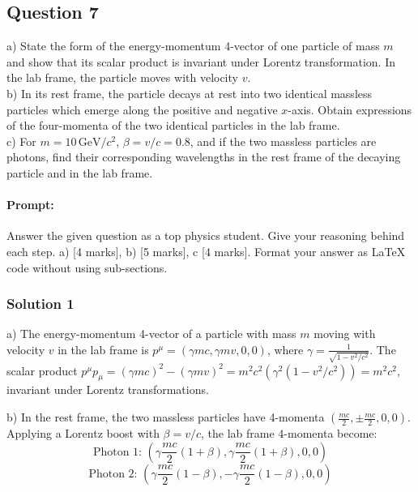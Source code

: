 \documentclass{article}
\begin{document}
\subsection{Question 7}

a) State the form of the energy-momentum 4-vector of one particle of mass \(m\) and show that its scalar product is invariant under Lorentz transformation. In the lab frame, the particle moves with velocity \(v\). \\ 

b) In its rest frame, the particle decays at rest into two identical massless particles which emerge along the positive and negative \(x\)-axis. Obtain expressions of the four-momenta of the two identical particles in the lab frame. \\ 

c) For \(m = 10 \, \text{GeV}/c^2\), \(\beta = v/c = 0.8\), and if the two massless particles are photons, find their corresponding wavelengths in the rest frame of the decaying particle and in the lab frame. \\

\paragraph{Prompt: \\} 
Answer the given question as a top physics student. Give your reasoning behind each step. a) [4 marks], b) [5 marks], c [4 marks].
Format your answer as LaTeX code without using sub-sections.

\subsubsection{Solution 1}
a) The energy-momentum 4-vector of a particle with mass \( m \) moving with velocity \( v \) in the lab frame is \( p^\mu = \left( \gamma m c, \gamma m v, 0, 0 \right) \), where \( \gamma = \frac{1}{\sqrt{1 - v^2/c^2}} \). The scalar product \( p^\mu p_\mu = \left( \gamma m c \right)^2 - \left( \gamma m v \right)^2 = m^2 c^2 \left( \gamma^2 (1 - v^2/c^2) \right) = m^2 c^2 \), invariant under Lorentz transformations.

b) In the rest frame, the two massless particles have 4-momenta \( \left( \frac{m c}{2}, \pm \frac{m c}{2}, 0, 0 \right) \). Applying a Lorentz boost with \( \beta = v/c \), the lab frame 4-momenta become:
\[
\text{Photon 1: } \left( \gamma \frac{m c}{2} (1 + \beta), \gamma \frac{m c}{2} (1 + \beta), 0, 0 \right)
\]
\[
\text{Photon 2: } \left( \gamma \frac{m c}{2} (1 - \beta), -\gamma \frac{m c}{2} (1 - \beta), 0, 0 \right)
\]
\end{document}
